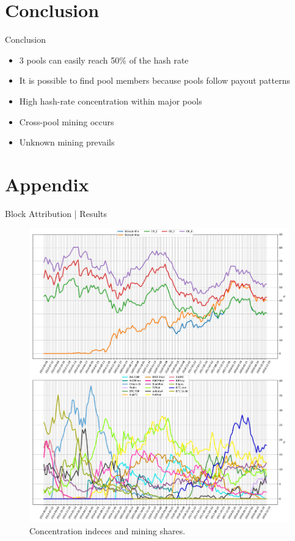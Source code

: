 \documentclass[10pt]{beamer}
\begin{document}
\section{Conclusion} 
\begin{frame}[fragile]{Conclusion}
    \begin{itemize}
        \item 3 pools can easily reach 50\% of the hash rate
        \item It is possible to find pool members because pools follow payout patterns
        \item High hash-rate concentration within major pools
        \item Cross-pool mining occurs
        \item Unknown mining prevails
    \end{itemize}
\end{frame}


%   
%   

\section{Appendix}
\begin{frame}[fragile]{Block Attribution | Results}
    \begin{figure}
        \centering
        \includegraphics[width=.6\textwidth]{images/mining_distribution_157.pdf}
        \caption{Concentration indeces and mining shares.} \label{fig:mining_distribution}
    \end{figure}
\end{frame}
\end{document}
